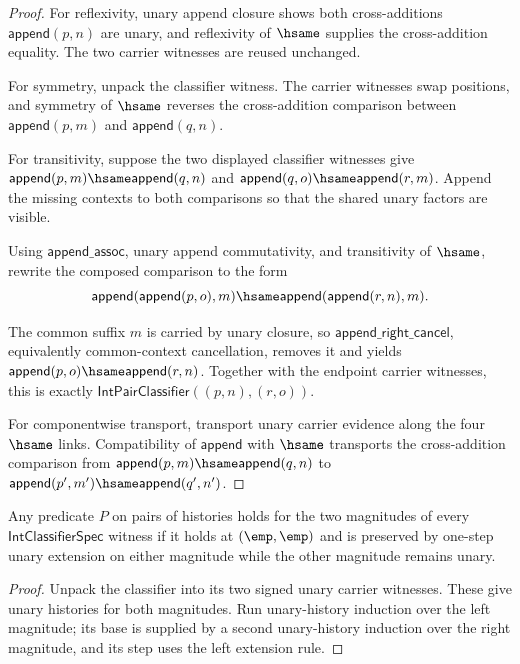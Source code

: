 \begin{proof}
For reflexivity, unary append closure shows both cross-additions
$\mathsf{append}(p,n)$ are unary, and reflexivity of $\hsame$ supplies the
cross-addition equality. The two carrier witnesses are reused unchanged.

For symmetry, unpack the classifier witness. The carrier witnesses swap
positions, and symmetry of $\hsame$ reverses the cross-addition comparison
between $\mathsf{append}(p,m)$ and $\mathsf{append}(q,n)$.

For transitivity, suppose the two displayed classifier witnesses give
$\mathsf{append}(p,m)\hsame\mathsf{append}(q,n)$ and
$\mathsf{append}(q,o)\hsame\mathsf{append}(r,m)$. Append the missing
contexts to both comparisons so that the shared unary factors are visible.

Using $\mathsf{append\_assoc}$, unary append commutativity, and transitivity
of $\hsame$, rewrite the composed comparison to the form
$$
\mathsf{append}(\mathsf{append}(p,o),m)
\hsame
\mathsf{append}(\mathsf{append}(r,n),m).
$$

The common suffix $m$ is carried by unary closure, so
$\mathsf{append\_right\_cancel}$, equivalently common-context cancellation,
removes it and yields
$\mathsf{append}(p,o)\hsame\mathsf{append}(r,n)$. Together with the endpoint
carrier witnesses, this is exactly
$\mathsf{IntPairClassifier}((p,n),(r,o))$.

For componentwise transport, transport unary carrier evidence along the four
$\hsame$ links. Compatibility of $\mathsf{append}$ with $\hsame$ transports
the cross-addition comparison from
$\mathsf{append}(p,m)\hsame\mathsf{append}(q,n)$ to
$\mathsf{append}(p',m')\hsame\mathsf{append}(q',n')$.
\end{proof}

\begin{theorem}
\label{thm:int-classifier-magnitude-pair-induction}
Any predicate \(P\) on pairs of histories holds for the two magnitudes of every
\(\mathsf{IntClassifierSpec}\) witness if it holds at \((\emp,\emp)\) and is
preserved by one-step unary extension on either magnitude while the other
magnitude remains unary.
\end{theorem}
\begin{proof}
Unpack the classifier into its two signed unary carrier witnesses. These give
unary histories for both magnitudes. Run unary-history induction over the left
magnitude; its base is supplied by a second unary-history induction over the
right magnitude, and its step uses the left extension rule.
\end{proof}

